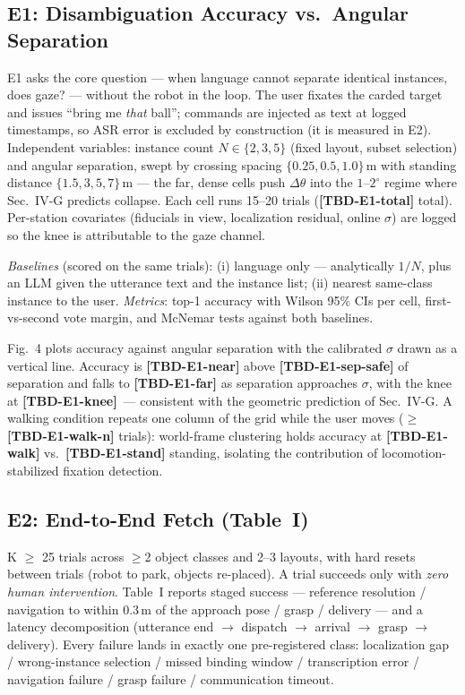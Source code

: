 \documentclass[letterpaper, 10 pt, conference]{ieeeconf}  %
\newcommand{\TBD}[1]{\textbf{\color{red}[TBD-#1]}}
\begin{document}
\subsection{E1: Disambiguation Accuracy vs.\ Angular Separation}
E1 asks the core question --- when language cannot separate identical
instances, does gaze? --- without the robot in the loop. The user
fixates the carded target and issues ``bring me \emph{that} ball'';
commands are injected as text at logged timestamps, so ASR error is
excluded by construction (it is measured in E2). Independent
variables: instance count $N \in \{2,3,5\}$ (fixed layout, subset
selection) and angular separation, swept by crossing spacing
$\{0.25, 0.5, 1.0\}$\,m with standing distance $\{1.5, 3, 5, 7\}$\,m
--- the far, dense cells push $\Delta\theta$ into the
$1$--$2^\circ$ regime where Sec.~IV-G predicts collapse. Each cell
runs 15--20 trials (\TBD{E1-total} total). Per-station covariates
(fiducials in view, localization residual, online $\sigma$) are
logged so the knee is attributable to the gaze channel.

\emph{Baselines} (scored on the same trials): (i) language only ---
analytically $1/N$, plus an LLM given the utterance text and the
instance list; (ii) nearest same-class instance to the user.
\emph{Metrics}: top-1 accuracy with Wilson 95\% CIs per cell,
first-vs-second vote margin, and McNemar tests against both
baselines.

Fig.~4 plots accuracy against angular separation with the calibrated
$\sigma$ drawn as a vertical line. Accuracy is \TBD{E1-near} above
\TBD{E1-sep-safe} of separation and falls to \TBD{E1-far} as
separation approaches $\sigma$, with the knee at
\TBD{E1-knee}~--- consistent with the geometric prediction of
Sec.~IV-G. %
A walking condition repeats one column of the grid while the user
moves ($\ge$\TBD{E1-walk-n} trials): world-frame clustering holds
accuracy at \TBD{E1-walk} vs.\ \TBD{E1-stand} standing, isolating the
contribution of locomotion-stabilized fixation detection.

\subsection{E2: End-to-End Fetch (Table~I)}
K $\ge$ 25 trials across $\ge$2 object classes and 2--3 layouts, with
hard resets between trials (robot to park, objects re-placed). A
trial succeeds only with \emph{zero human intervention}. Table~I
reports staged success --- reference resolution / navigation to
within 0.3\,m of the approach pose / grasp / delivery --- and a
latency decomposition (utterance end $\to$ dispatch $\to$ arrival
$\to$ grasp $\to$ delivery). Every failure lands in exactly one
pre-registered class: localization gap / wrong-instance selection /
missed binding window / transcription error / navigation failure /
grasp failure / communication timeout.
\end{document}
